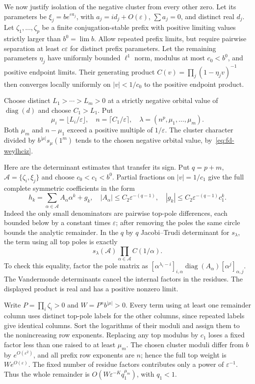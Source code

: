 We now justify isolation of the negative cluster from every other zero.
Let its parameters be $\xi_j=b e^{\varepsilon a_j}$, with
$a_j=id_j+O(\varepsilon)$, $\sum a_j=0$, and distinct real $d_j$.
Let $\zeta_1,\ldots,\zeta_p$ be a finite conjugation-stable prefix
with positive limiting values strictly larger than $b^0=\lim b$.
Allow repeated prefix limits, but require pairwise separation at least
$c\varepsilon$ for distinct prefix parameters.  Let the remaining
parameters $\eta_j$ have uniformly bounded $\ell^1$ norm, modulus at
most $c_0<b^0$, and positive endpoint limits.  Their generating product
$C(v)=\prod_j(1-\eta_jv)^{-1}$ then converges locally uniformly on
$|v|<1/c_0$ to the positive endpoint product.

Choose distinct $L_1>\cdots>L_m>0$ at a strictly negative orbital
value of $\operatorname{diag}(d)$ and choose $C_1>L_1$.
Put
\[
 \mu_i=\lfloor L_i/\varepsilon\rfloor,\quad
 n=\lceil C_1/\varepsilon\rceil,\quad
 \lambda=(n^p,\mu_1,\ldots,\mu_m).
\]
Both $\mu_m$ and $n-\mu_1$ exceed a positive multiple of
$1/\varepsilon$.  The cluster character divided by
$b^{|\mu|}s_\mu(1^m)$ tends to the chosen negative orbital value,
by~\eqref{eq:fd-weylhciz}.

Here are the determinant estimates that transfer its sign.
Put $q=p+m$, $\mathcal A=\{\zeta_i,\xi_j\}$ and choose
$c_0<c_1<b^0$.  Partial fractions on $|v|=1/c_1$ give the full
complete symmetric coefficients in the form
\[
 h_k=\sum_{\alpha\in\mathcal A}A_\alpha\alpha^k+g_k,
 \quad |A_\alpha|\le C_2\varepsilon^{-(q-1)},\quad
 |g_k|\le C_2\varepsilon^{-(q-1)}c_1^k.
\]
Indeed the only small denominators are pairwise top-pole differences,
each bounded below by a constant times $\varepsilon$; after removing
the poles the same circle bounds the analytic remainder.
In the $q$ by $q$ Jacobi--Trudi determinant for $s_\lambda$, the
term using all top poles is exactly
\[
 s_\lambda(\mathcal A)\prod_{\alpha\in\mathcal A}C(1/\alpha).
\]
To check this equality, factor the pole matrix as
$[\alpha^{\lambda_i-i}]_{i,\alpha}
\operatorname{diag}(A_\alpha)[\alpha^j]_{\alpha,j}$.
The Vandermonde determinants cancel the internal factors in the residues.
The displayed product is real and has a positive nonzero limit.

Write $P=\prod_i\zeta_i>0$ and $W=P^n b^{|\mu|}>0$.
Every term using at least one remainder column uses distinct top-pole
labels for the other columns, since repeated labels give identical
columns.  Sort the logarithms of their moduli and assign them to the
nonincreasing row exponents.  Replacing any top modulus by $c_1$
loses a fixed factor less than one raised to at least $\mu_m$.
The chosen cluster moduli differ from $b$ by $e^{O(\varepsilon^2)}$,
and all prefix row exponents are $n$; hence the full top weight is
$W e^{O(\varepsilon)}$.
The fixed number of residue factors contributes only a power of
$\varepsilon^{-1}$.  Thus the whole remainder is
$O(W\varepsilon^{-K}q_1^{\mu_m})$, with $q_1<1$.


